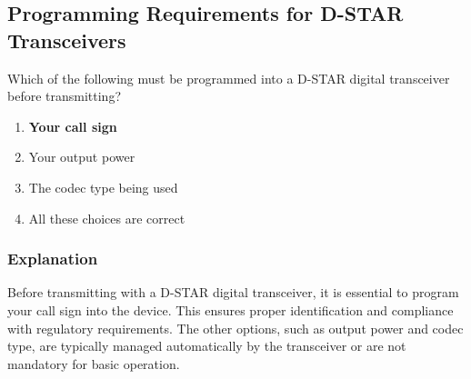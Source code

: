 \subsection{Programming Requirements for D-STAR Transceivers}
\label{T4B11}

\begin{tcolorbox}[colback=gray!10!white,colframe=black!75!black,title=T4B11]
Which of the following must be programmed into a D-STAR digital transceiver before transmitting?
\begin{enumerate}[noitemsep]
    \item \textbf{Your call sign}
    \item Your output power
    \item The codec type being used
    \item All these choices are correct
\end{enumerate}
\end{tcolorbox}

\subsubsection*{Explanation}
Before transmitting with a D-STAR digital transceiver, it is essential to program your call sign into the device. This ensures proper identification and compliance with regulatory requirements. The other options, such as output power and codec type, are typically managed automatically by the transceiver or are not mandatory for basic operation.